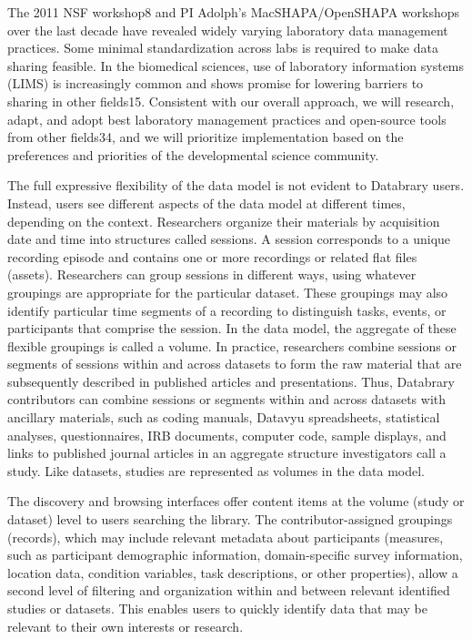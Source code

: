 \documentclass[letterpaper,man,natbib]{apa6}
\begin{document}
The 2011 NSF workshop8 and PI Adolph's MacSHAPA/OpenSHAPA workshops over the last decade have revealed widely varying laboratory data management practices. Some minimal standardization across labs is required to make data sharing feasible. 
In the biomedical sciences, use of laboratory information systems (LIMS) is increasingly common and shows promise for lowering barriers to sharing in other fields15. 
Consistent with our overall approach, we will research, adapt, and adopt best laboratory management practices and open-source tools from other fields34, and we will prioritize implementation based on the preferences and priorities of the developmental science community.

The full expressive flexibility of the data model is not evident to Databrary users. 
Instead, users see different aspects of the data model at different times, depending on the context. Researchers organize their materials by acquisition date and time into structures called sessions.
A session corresponds to a unique recording episode and contains one or more recordings or related flat files (assets). Researchers can group sessions in different ways, using whatever groupings are appropriate for
the particular dataset. 
These groupings may also identify particular time segments of a recording to distinguish tasks, events, or
participants that comprise the session. 
In the data model, the aggregate of these flexible groupings is called a volume. 
In practice, researchers combine sessions or segments of sessions within and across datasets to
form the raw material that are subsequently described in published
articles and presentations. 
Thus, Databrary contributors can combine sessions or segments within and across datasets with ancillary
materials, such as coding manuals, Datavyu spreadsheets, statistical analyses, questionnaires, IRB documents, computer code, sample displays, and links to published journal articles in an aggregate structure
investigators call a study. 
Like datasets, studies are represented as volumes in the data model.

The discovery and browsing interfaces offer content items at the volume (study or dataset) level to users searching the library. The contributor-assigned groupings (records), which may include relevant
metadata about participants (measures, such as participant demographic information, domain-specific survey information, location data, condition variables, task descriptions, or other properties), allow a
second level of filtering and organization within and between relevant
identified studies or datasets.
This enables users to quickly identify data that may be relevant to their own interests or research.
\end{document}
